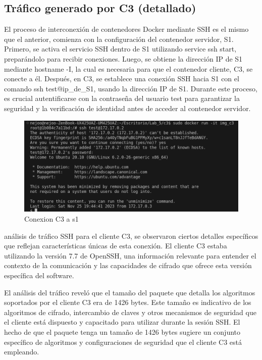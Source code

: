 \documentclass[letter,12pt]{article}
\begin{document}
\subsection{Tráfico generado por C3 (detallado)}
El proceso de interconexión de contenedores Docker mediante SSH es el mismo que el anterior, comienza con la configuración del contenedor servidor, S1. Primero, se activa el servicio SSH dentro de S1 utilizando service ssh start, preparándolo para recibir conexiones. Luego, se obtiene la dirección IP de S1 mediante hostname -I, la cual es necesaria para que el contenedor cliente, C3, se conecte a él. Después, en C3, se establece una conexión SSH hacia S1 con el comando ssh test@ip\_de\_S1, usando la dirección IP de S1. Durante este proceso, es crucial autentificarse con la contraseña del usuario test para garantizar la seguridad y la verificación de identidad antes de acceder al contenedor servidor.
    \begin{figure}[H]
        \centering
        \includegraphics[width=1\textwidth]{img/creacion_c3.png}    
        \caption{Conexion C3 a s1}
    \end{figure}

análisis de tráfico SSH para el cliente C3, se observaron ciertos detalles específicos que reflejan características únicas de esta conexión. El cliente C3 estaba utilizando la versión 7.7 de OpenSSH, una información relevante para entender el contexto de la comunicación y las capacidades de cifrado que ofrece esta versión específica del software.

El análisis del tráfico reveló que el tamaño del paquete que detalla los algoritmos soportados por el cliente C3 era de 1426 bytes. Este tamaño es indicativo de los algoritmos de cifrado, intercambio de claves y otros mecanismos de seguridad que el cliente está dispuesto y capacitado para utilizar durante la sesión SSH. El hecho de que el paquete tenga un tamaño de 1426 bytes sugiere un conjunto específico de algoritmos y configuraciones de seguridad que el cliente C3 está empleando.
\end{document}
